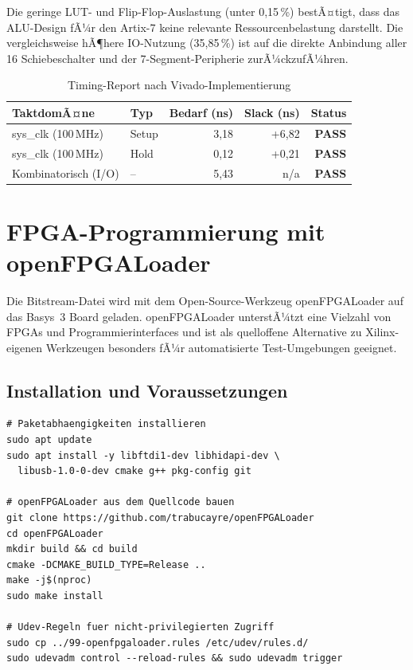 ﻿\documentclass[12pt,a4paper]{report}
\begin{document}
Die geringe LUT- und Flip-Flop-Auslastung (unter 0{,}15\,\%) bestÃ¤tigt, dass das ALU-Design fÃ¼r den Artix-7 keine relevante Ressourcenbelastung darstellt. Die vergleichsweise hÃ¶here IO-Nutzung (35{,}85\,\%) ist auf die direkte Anbindung aller 16 Schiebeschalter und der 7-Segment-Peripherie zurÃ¼ckzufÃ¼hren.

\begin{table}[H]
\centering
\begin{tabular}{|l|l|r|r|r|}
\hline
\textbf{TaktdomÃ¤ne} & \textbf{Typ} & \textbf{Bedarf (ns)} & \textbf{Slack (ns)} & \textbf{Status} \\
\hline
sys\_clk (100\,MHz) & Setup & 3{,}18 & +6{,}82 & \textbf{PASS} \\
sys\_clk (100\,MHz) & Hold  & 0{,}12 & +0{,}21 & \textbf{PASS} \\
Kombinatorisch (I/O)& --    & 5{,}43 & n/a     & \textbf{PASS} \\
\hline
\end{tabular}
\caption{Timing-Report nach Vivado-Implementierung}
\label{tab:timing}
\end{table}

\section{FPGA-Programmierung mit openFPGALoader}
\label{sec:fpga_programmierung}

Die Bitstream-Datei wird mit dem Open-Source-Werkzeug openFPGALoader auf das Basys~3 Board geladen. openFPGALoader unterstÃ¼tzt eine Vielzahl von FPGAs und Programmierinterfaces und ist als quelloffene Alternative zu Xilinx-eigenen Werkzeugen besonders fÃ¼r automatisierte Test-Umgebungen geeignet.

\subsection{Installation und Voraussetzungen}
\label{subsec:openfpgaloader_install}

\begin{lstlisting}[style=bashstyle, caption={Installation von openFPGALoader unter Ubuntu/Debian}]
# Paketabhaengigkeiten installieren
sudo apt update
sudo apt install -y libftdi1-dev libhidapi-dev \
  libusb-1.0-0-dev cmake g++ pkg-config git

# openFPGALoader aus dem Quellcode bauen
git clone https://github.com/trabucayre/openFPGALoader
cd openFPGALoader
mkdir build && cd build
cmake -DCMAKE_BUILD_TYPE=Release ..
make -j$(nproc)
sudo make install

# Udev-Regeln fuer nicht-privilegierten Zugriff
sudo cp ../99-openfpgaloader.rules /etc/udev/rules.d/
sudo udevadm control --reload-rules && sudo udevadm trigger
\end{lstlisting}
\end{document}
